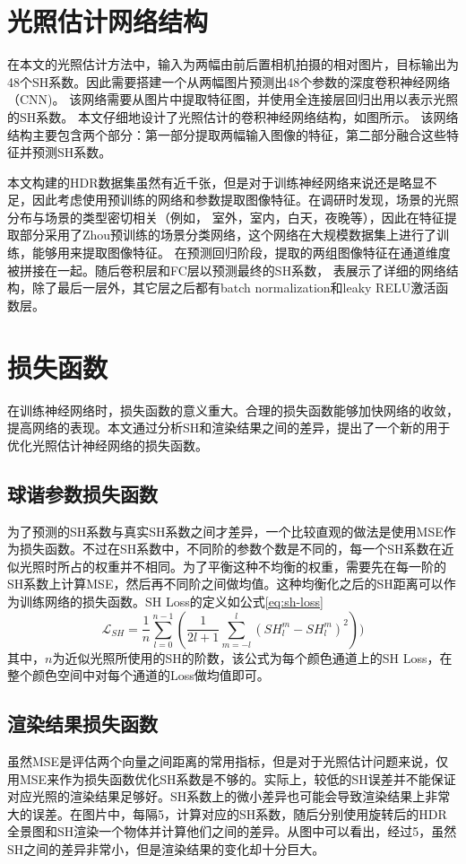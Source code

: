 \section{光照估计网络结构}
在本文的光照估计方法中，输入为两幅由前后置相机拍摄的相对图片，目标输出为48个SH系数。因此需要搭建一个从两幅图片预测出48个参数的深度卷积神经网络（CNN)。
该网络需要从图片中提取特征图，并使用全连接层回归出用以表示光照的SH系数。
本文仔细地设计了光照估计的卷积神经网络结构，如图所示。
该网络结构主要包含两个部分：第一部分提取两幅输入图像的特征，第二部分融合这些特征并预测SH系数。 

本文构建的HDR数据集虽然有近千张，但是对于训练神经网络来说还是略显不足，因此考虑使用预训练的网络和参数提取图像特征。在调研时发现，场景的光照分布与场景的类型密切相关（例如， 室外，室内，白天，夜晚等），因此在特征提取部分采用了Zhou预训练的场景分类网络\cite{zhou2017places}，这个网络在大规模数据集上进行了训练，能够用来提取图像特征。 在预测回归阶段，提取的两组图像特征在通道维度被拼接在一起。随后卷积层和FC层以预测最终的SH系数， 表展示了详细的网络结构，除了最后一层外，其它层之后都有batch normalization和leaky RELU激活函数层。
\section{损失函数}
在训练神经网络时，损失函数的意义重大。合理的损失函数能够加快网络的收敛，提高网络的表现。本文通过分析SH和渲染结果之间的差异，提出了一个新的用于优化光照估计神经网络的损失函数。
\subsection{球谐参数损失函数} 为了预测的SH系数与真实SH系数之间才差异，一个比较直观的做法是使用MSE作为损失函数。不过在SH系数中，不同阶的参数个数是不同的，每一个SH系数在近似光照时所占的权重并不相同。为了平衡这种不均衡的权重，需要先在每一阶的SH系数上计算MSE，然后再不同阶之间做均值。这种均衡化之后的SH距离可以作为训练网络的损失函数。SH Loss的定义如公式\ref{eq:sh-loss}
\begin{equation}
    \mathcal{L}_{SH} = \frac{1}{n}\sum_{l=0}^{n-1}(\frac{1}{2l+1}\sum_{m=-l}^{l}(SH^m_l - SH^m_l)^2))
    \label{eq:sh-loss}
\end{equation}
其中，$n$为近似光照所使用的SH的阶数，该公式为每个颜色通道上的SH Loss，在整个颜色空间中对每个通道的Loss做均值即可。

\subsection{渲染结果损失函数} 虽然MSE是评估两个向量之间距离的常用指标，但是对于光照估计问题来说，仅用MSE来作为损失函数优化SH系数是不够的。实际上，较低的SH误差并不能保证对应光照的渲染结果足够好。SH系数上的微小差异也可能会导致渲染结果上非常大的误差。在图片中，每隔5，计算对应的SH系数，随后分别使用旋转后的HDR全景图和SH渲染一个物体并计算他们之间的差异。从图中可以看出，经过5，虽然SH之间的差异非常小，但是渲染结果的变化却十分巨大。

